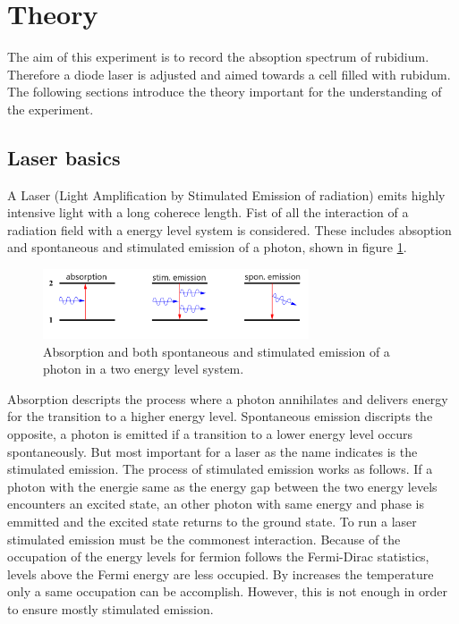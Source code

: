 \section{Theory}
\label{sec:theory}
The aim of this experiment is to record the absoption spectrum
of rubidium. Therefore a diode laser is adjusted and aimed towards a cell
filled with rubidum.
The following sections introduce the theory
important for the understanding of the experiment.

\subsection{Laser basics}
\label{subsec:Laser}
A Laser (Light Amplification by Stimulated Emission of radiation)
emits highly intensive light with a long coherece length.
Fist of all the interaction of a radiation field with
a energy level system is considered. These includes
absoption and spontaneous and stimulated emission
of a photon, shown in figure \ref{fig:ab_em}.
\begin{figure}
\centering
\includegraphics[width=0.7\textwidth]{ab_und_emiss.png}
\caption{Absorption and both spontaneous and stimulated emission of a photon in a two energy level system.
\cite{V61}}
\label{fig:ab_em}
\end{figure}
Absorption descripts the process where a photon annihilates and
delivers energy for the transition
to a higher energy level.
Spontaneous emission discripts the opposite, a photon is
emitted if a transition to a lower energy
level occurs spontaneously.
But most important for a laser as the name indicates
is the stimulated emission.
The process of stimulated emission works as follows.
If a photon with the energie same as
the energy gap between the two energy levels
encounters an excited state, an other photon with
same energy and phase is emmitted and the excited state
returns to the ground state.
To run a laser stimulated emission must be the commonest interaction.
Because of the occupation of the energy levels for fermion follows
the Fermi-Dirac statistics, %
levels above the Fermi energy are
less occupied. By increases the temperature only
a same occupation can be accomplish.
However, this is not enough in order to ensure mostly stimulated emission.

